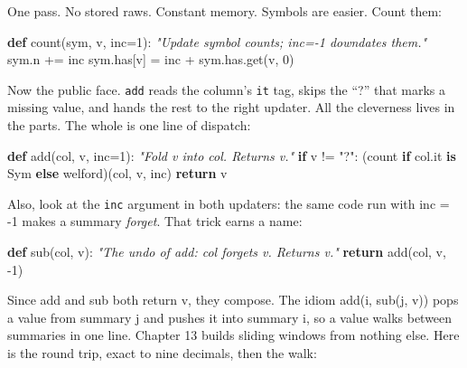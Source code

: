 \documentclass[
  justified]{tufte-book}
\newenvironment{Shaded}{}{}
\newcommand{\CommentTok}[1]{\textcolor[rgb]{0.38,0.63,0.69}{\textit{#1}}}
\newcommand{\ControlFlowTok}[1]{\textcolor[rgb]{0.00,0.44,0.13}{\textbf{#1}}}
\newcommand{\DecValTok}[1]{\textcolor[rgb]{0.25,0.63,0.44}{#1}}
\newcommand{\KeywordTok}[1]{\textcolor[rgb]{0.00,0.44,0.13}{\textbf{#1}}}
\newcommand{\NormalTok}[1]{#1}
\newcommand{\OperatorTok}[1]{\textcolor[rgb]{0.40,0.40,0.40}{#1}}
\newcommand{\StringTok}[1]{\textcolor[rgb]{0.25,0.44,0.63}{#1}}
\begin{document}
One pass. No stored raws. Constant memory. Symbols are easier. Count
them:

\begin{Shaded}
\begin{Highlighting}[]
\KeywordTok{def}\NormalTok{ count(sym, v, inc}\OperatorTok{=}\DecValTok{1}\NormalTok{):}
  \CommentTok{"Update symbol counts; inc={-}1 downdates them."}
\NormalTok{  sym.n }\OperatorTok{+=}\NormalTok{ inc}
\NormalTok{  sym.has[v] }\OperatorTok{=}\NormalTok{ inc }\OperatorTok{+}\NormalTok{ sym.has.get(v, }\DecValTok{0}\NormalTok{)}
\end{Highlighting}
\end{Shaded}

Now the public face. \texttt{add} reads the column's \texttt{it} tag,
skips the ``?'' that marks a missing value, and hands the rest to the
right updater. All the cleverness lives in the parts. The whole is one
line of dispatch:

\begin{Shaded}
\begin{Highlighting}[]
\KeywordTok{def}\NormalTok{ add(col, v, inc}\OperatorTok{=}\DecValTok{1}\NormalTok{):}
  \CommentTok{"Fold v into col. Returns v."}
  \ControlFlowTok{if}\NormalTok{ v }\OperatorTok{!=} \StringTok{"?"}\NormalTok{:}
\NormalTok{    (count }\ControlFlowTok{if}\NormalTok{ col.it }\KeywordTok{is}\NormalTok{ Sym }\ControlFlowTok{else}\NormalTok{ welford)(col, v, inc)}
  \ControlFlowTok{return}\NormalTok{ v}
\end{Highlighting}
\end{Shaded}

Also, look at the \texttt{inc} argument in both updaters: the same code
run with inc = -1 makes a summary \emph{forget}. That trick earns a
name:

\begin{Shaded}
\begin{Highlighting}[]
\KeywordTok{def}\NormalTok{ sub(col, v):}
  \CommentTok{"The undo of add: col forgets v. Returns v."}
  \ControlFlowTok{return}\NormalTok{ add(col, v, }\OperatorTok{{-}}\DecValTok{1}\NormalTok{)}
\end{Highlighting}
\end{Shaded}

Since add and sub both return v, they compose. The idiom add(i, sub(j,
v)) pops a value from summary j and pushes it into summary i, so a value
walks between summaries in one line. Chapter 13 builds sliding windows
from nothing else. Here is the round trip, exact to nine decimals, then
the walk:
\end{document}
